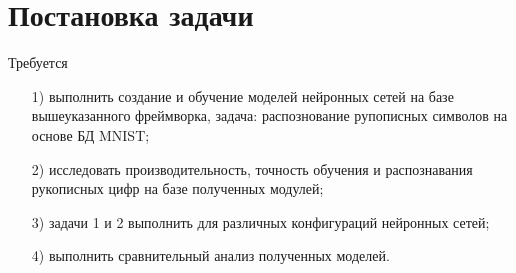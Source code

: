 \section{Постановка задачи}

Требуется

\begin{enumerate}
    \item[1)] выполнить создание и обучение моделей нейронных сетей на базе вышеуказанного фреймворка, задача: распознование рупописных символов на основе БД MNIST;
    \item[2)] исследовать производительность, точность обучения и распознавания рукописных цифр на базе полученных модулей;
    \item[3)] задачи 1 и 2 выполнить для различных конфигураций нейронных сетей;
    \item[4)] выполнить сравнительный анализ полученных моделей.
\end{enumerate}